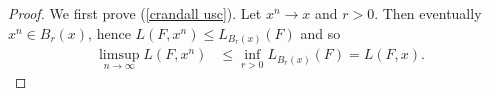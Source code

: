 \documentclass[reqno,11pt]{amsart}
\newcommand*\dif{\mathop{}\!\mathrm{d}}
\theoremstyle{definition}
\numberwithin{equation}{section}
\begin{document}
\begin{proof}
We first prove (\ref{crandall usc}).
Let $x^n \to x$ and $r > 0$. Then eventually $x^n \in B_r(x)$, hence $L(F, x^n) \leq L_{B_r(x)}(F)$ and so
\begin{align*}
\limsup_{n \to \infty} L(F, x^n) &\leq \inf_{r > 0} L_{B_r(x)}(F) = L(F, x).
\end{align*}



\end{proof}
\end{document}
